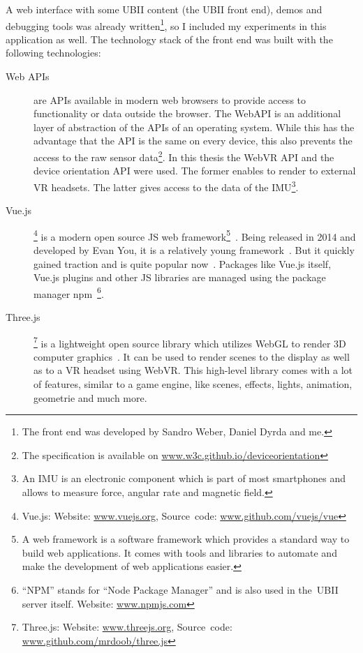 A web interface with some \ac{UBII} content (the \ac{UBII} front end), demos and debugging tools was already written\footnote{The front end was developed by Sandro Weber, Daniel Dyrda and me.}, so I included my experiments in this application as well. The technology stack of the front end was built with the following technologies:
\begin{description}
  \item[Web APIs] are \acfp{API} available in modern web browsers to provide access to functionality or data outside the browser. The WebAPI is an additional layer of abstraction of the \acp{API} of an operating system. While this has the advantage that the API is the same on every device, this also prevents the access to the raw sensor data\footnote{The specification is available on \href{https://w3c.github.io/deviceorientation/}{www.w3c.github.io/deviceorientation}}. In this thesis the WebVR \ac{API} and the device orientation \ac{API} were used. The former enables to render to external \ac{VR} headsets. The latter gives access to the data of the \acf{IMU}\footnote{An IMU is an electronic component which is part of most smartphones and allows to measure force, angular rate and magnetic field.}.
  \item[Vue.js]\footnote{Vue.js: Website: \href{https://vuejs.org/}{www.vuejs.org}, Source~code: \href{https://github.com/vuejs/vue}{www.github.com/vuejs/vue}} is a modern open source \acl{JS} web framework\footnote{A web framework is a software framework which provides a standard way to build web applications. It comes with tools and libraries to automate and make the development of web applications easier.}~\cite{You.2019}. Being released in 2014 and developed by Evan You, it is a relatively young framework~\cite[17]{Koetsier.2016}. But it quickly gained traction and is quite popular now~\cite[12\psq]{Koetsier.2016}.
  Packages like Vue.js itself, Vue.js plugins and other \acl{JS} libraries are managed using the package manager npm~\footnote{\enquote{NPM} stands for \enquote{Node Package Manager} and is also used in the~\ac{UBII} server itself. Website: \href{https://www.npmjs.com/}{www.npmjs.com}}.
  \item[Three.js]\footnote{Three.js: Website: \href{https://threejs.org/}{www.threejs.org}, Source~code: \href{https://github.com/mrdoob/three.js/}{www.github.com/mrdoob/three.js}} is a lightweight open source library which utilizes WebGL to render \ac{3D} computer graphics~\cite{RicardoCabello.2019}. It can be used to render scenes to the display as well as to a VR headset using WebVR. This high-level library comes with a lot of features, similar to a game engine, like scenes, effects, lights, animation, geometrie and much more.

\end{description}
